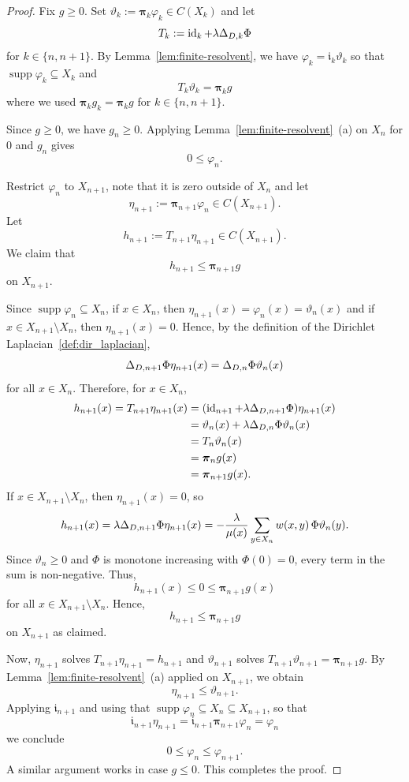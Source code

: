 \documentclass[letterpaper]{article}
\theoremstyle{definition}
\theoremstyle{named}
\numberwithin{equation}{section}
\newcommand{\Deltadir}[1][]{\Delta_{D\ifx&#1&\else,#1\fi}}
\begin{document}
\begin{proof}
Fix $g\geq 0$. Set $\vartheta_k:=\boldsymbol{\pi}_k\varphi_k\in C(X_k)$ 
and let
\[
T_k:=\operatorname{id}_k+\lambda\Deltadir[k]\Phi
\]
for $k \in \{n,n+1\}$.
By Lemma~\ref{lem:finite-resolvent}, we have $\varphi_k=\boldsymbol{\mathfrak i}_k\vartheta_k$
so that $\operatorname{supp} \varphi_k \subseteq X_k$
and
\[
T_k\vartheta_k=\boldsymbol{\pi}_k g
\]
where we used $\boldsymbol{\pi}_k g_k=\boldsymbol{\pi}_k g$ for $k\in \{n,n+1\}$.

Since $g\ge 0$, we have $g_n\ge 0$. Applying Lemma~\ref{lem:finite-resolvent}~(a) on $X_n$ 
for $0$ and $g_n$ gives
\[
0\le\varphi_n.
\]

Restrict $\varphi_n$ to $X_{n+1}$, note that it is zero outside of $X_n$ and let
\[
\eta_{n+1}:=\boldsymbol{\pi}_{n+1}\varphi_n\in C(X_{n+1}).
\]
Let
\[
h_{n+1}:=T_{n+1}\eta_{n+1}\in C(X_{n+1}).
\]
We claim that
\[
h_{n+1}\le \boldsymbol{\pi}_{n+1} g
\]
on $X_{n+1}$.

Since $\operatorname{supp}\varphi_n\subseteq X_n$, if $x\in X_n$, 
then $\eta_{n+1}(x)=\varphi_n(x)=\vartheta_n(x)$ and if $x\in X_{n+1}\setminus X_n$,
then $\eta_{n+1}(x)=0$. Hence, by the definition of the Dirichlet Laplacian~\eqref{def:dir_laplacian},
\[
\Deltadir[n+1]\Phi \eta_{n+1}(x)
=
\Deltadir[n]\Phi \vartheta_n(x)
\]
for all $x\in X_n$.
Therefore, for $x\in X_n$,
\begin{align*}
   h_{n+1}(x)
=T_{n+1}\eta_{n+1}(x)
&=(\operatorname{id}_{n+1}+\lambda\Deltadir[n+1]\Phi)\eta_{n+1}(x)\\
&=\vartheta_n(x)+\lambda\Deltadir[n]\Phi \vartheta_n(x)\\
&=T_n\vartheta_n(x)\\
&=\boldsymbol{\pi}_n g(x)\\
&=\boldsymbol{\pi}_{n+1} g(x).
\end{align*}
If $x\in X_{n+1}\setminus X_n$, then $\eta_{n+1}(x)=0$, so
\[
h_{n+1}(x)
=
\lambda\Deltadir[n+1]\Phi \eta_{n+1}(x)
=
-\frac{\lambda}{\mu(x)}
\sum_{y\in X_n} w(x,y)\,\Phi \vartheta_n(y).
\]
Since $\vartheta_n\ge 0$ and {$\Phi$ is monotone increasing with $\Phi(0)=0$}, every term in the sum is non-negative. Thus,
\[
h_{n+1}(x)\le 0\le \boldsymbol{\pi}_{n+1} g(x)
\]
for all $x\in X_{n+1}\setminus X_n$.
Hence,
\[
h_{n+1}\le \boldsymbol{\pi}_{n+1} g
\]
on $X_{n+1}$ as claimed.

Now, $\eta_{n+1}$ solves $T_{n+1}\eta_{n+1}=h_{n+1}$ 
and $\vartheta_{n+1}$ solves $T_{n+1}\vartheta_{n+1}=\boldsymbol{\pi}_{n+1} g$. By Lemma~\ref{lem:finite-resolvent}~(a) applied on $X_{n+1}$, we obtain
\[
\eta_{n+1}\le \vartheta_{n+1}.
\]
Applying $\boldsymbol{\mathfrak i}_{n+1}$ and using that $\operatorname{supp}\varphi_n\subseteq X_n\subseteq X_{n+1}$, so that
\[
\boldsymbol{\mathfrak i}_{n+1}\eta_{n+1}
=\boldsymbol{\mathfrak i}_{n+1}\boldsymbol{\pi}_{n+1}\varphi_n
=\varphi_n
\]
we conclude
\[
0\le \varphi_n\le \varphi_{n+1}.
\]
A similar argument works in case $g \leq 0$. This completes the proof.
\end{proof}
\end{document}
